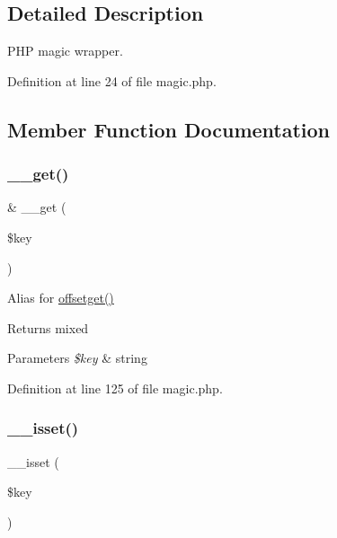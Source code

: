 \subsection{Detailed Description}
P\+HP magic wrapper. 

Definition at line 24 of file magic.\+php.



\subsection{Member Function Documentation}
\hypertarget{class_magic_ae23a2c24bd42a7be642cdb71b58dbc5a}{}\label{class_magic_ae23a2c24bd42a7be642cdb71b58dbc5a} 
\subsubsection{\texorpdfstring{\+\_\+\+\_\+get()}{\_\_get()}}
{\footnotesize\ttfamily \& \+\_\+\+\_\+get (\begin{DoxyParamCaption}\item[{}]{\$key }\end{DoxyParamCaption})}

Alias for \hyperlink{class_magic_a4736f7355697c49bcd06b643b4077e8a}{offsetget()} \begin{DoxyReturn}{Returns}
mixed 
\end{DoxyReturn}

\begin{DoxyParams}{Parameters}
{\em \$key} & string \\
\hline
\end{DoxyParams}


Definition at line 125 of file magic.\+php.

\hypertarget{class_magic_ae858fed7cd2822fbceac154138b68baa}{}\label{class_magic_ae858fed7cd2822fbceac154138b68baa} 
\subsubsection{\texorpdfstring{\+\_\+\+\_\+isset()}{\_\_isset()}}
{\footnotesize\ttfamily \+\_\+\+\_\+isset (\begin{DoxyParamCaption}\item[{}]{\$key }\end{DoxyParamCaption})}

